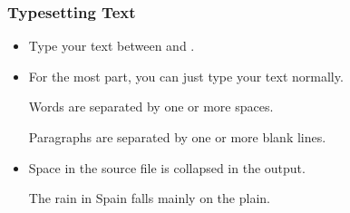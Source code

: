 \documentclass{beamer}
\begin{document}
\subsubsection{Typesetting Text}
\begin{frame}[fragile]{\insertsubsection{}}
\small
\begin{itemize}
\item Type your text between  and .
\item For the most part, you can just type your text normally.
\begin{exampletwouptiny}
Words are separated by one or more
spaces.

Paragraphs are separated by one
or more blank lines.
\end{exampletwouptiny}
\item Space in the source file is collapsed in the output.
\begin{exampletwouptiny}
The   rain       in Spain
falls mainly on the plain.
\end{exampletwouptiny}
\end{itemize}
\end{frame}
\end{document}
